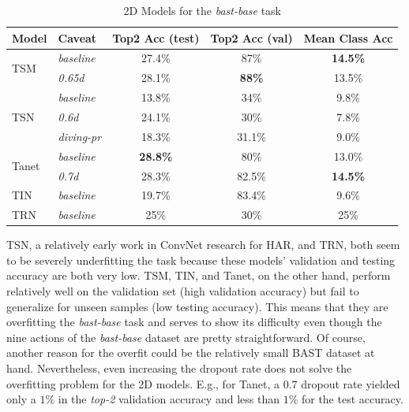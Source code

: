 \documentclass[extern,palatino]{cgMA}
\begin{document}
\begin{table}[h!]
  \begin{center}
    \caption{2D Models for the \textit{bast-base} task}
    \label{tab:research_question_1_2d_models}
    \begin{tabular}{l|l|c|c|c}
      \textbf{Model} & \textbf{Caveat} & \textbf{Top2 Acc (test)} & \textbf{Top2 Acc (val)} & \textbf{Mean Class Acc}\\
      \hline
      \multirow{2}{*}{TSM} & \textit{baseline} & 27.4\% & 87\% & \textbf{14.5\%}\\
       & \textit{0.65d} & 28.1\% & \textbf{88\%} & 13.5\%\\
      \hline
      \multirow{3}{*}{TSN} & \textit{baseline}  & 13.8\% & 34\% & 9.8\%\\
       & \textit{0.6d} & 24.1\% & 30\% & 7.8\%\\
       & \textit{diving-pr} & 18.3\% & 31.1\% & 9.0\%\\
      \hline
      \multirow{2}{*}{Tanet} & \textit{baseline} & \textbf{28.8\%} & 80\% & 13.0\%\\
       & \textit{0.7d} & 28.3\% & 82.5\% & \textbf{14.5\%}\\
      \hline
      \multirow{1}{*}{TIN} & \textit{baseline}& 19.7\% & 83.4\% & 9.6\%\\
      \hline
      \multirow{1}{*}{TRN} & \textit{baseline}& 25\% & 30\% & 25\%\\
      \hline
    \end{tabular}
  \end{center}
\end{table}

\noindent TSN, a relatively early work in ConvNet research for HAR, and TRN, both seem to be severely underfitting the task because these models' validation and testing accuracy are both very low. TSM, TIN, and Tanet, on the other hand, perform relatively well on the validation set (high validation accuracy) but fail to generalize for unseen samples (low testing accuracy). This means that they are overfitting the \textit{bast-base} task and serves to show its difficulty even though the nine actions of the \textit{bast-base} dataset are pretty straightforward. Of course, another reason for the overfit could be the relatively small BAST dataset at hand. Nevertheless, even increasing the dropout rate does not solve the overfitting problem for the 2D models. E.g., for Tanet, a $0.7$ dropout rate yielded only a $1\%$ in the \textit{top-2} validation accuracy and less than $1\%$ for the test accuracy. 
\end{document}
